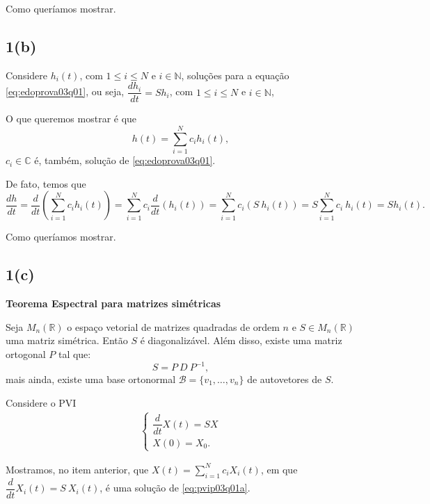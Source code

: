 Como queríamos mostrar.

\subsection*{1(b)}

Considere \(h_i(t)\), com \(1\le i\le N\) e \(i \in \mathbb{N}\), soluções para a equação \eqref{eq:edoprova03q01}, ou seja, \(\dfrac{dh_i}{dt} = S h_i\), com \(1\le i\le N\) e \(i \in \mathbb{N}\),

O que queremos mostrar é que
\[h(t) = \displaystyle\sum_{i=1}^{N} c_i h_i(t),\]
\(c_i \in \mathbb{C}\) é, também, solução de \eqref{eq:edoprova03q01}.

De fato, temos que
\[
\dfrac{dh}{dt}
=
\dfrac{d}{dt}\left(\displaystyle\sum_{i=1}^{N} c_i h_i(t)\right)
=
\displaystyle\sum_{i=1}^{N} c_i \dfrac{d}{dt} \left(h_i(t)\right)
=
\displaystyle\sum_{i=1}^{N} c_i \left(S\ h_i(t)\right)
=
S \displaystyle\sum_{i=1}^{N} c_i \ h_i(t)
=
S h_i(t).
\]

Como queríamos mostrar.


\subsection*{1(c)}

\textbf{Teorema Espectral para matrizes simétricas}

Seja \(M_n(\mathbb{R})\) o espaço vetorial de matrizes quadradas de ordem \(n\) e \(S \in M_n(\mathbb{R})\) uma matriz simétrica. Então \(S\) é diagonalizável. Além disso, existe uma matriz ortogonal \(P\) tal que:
\begin{equation}\label{eq:matrizdiagonal}
S = P\ D\ P^{-1},
\end{equation}
mais ainda, existe uma base ortonormal \(\mathcal{B} = \{v_1, \ldots, v_n\}\) de autovetores de \(S\).

Considere o PVI
\begin{eqnarray}
\left\{\begin{array}{rcl}
\label{eq:pvip03q01a}
\dfrac{d}{dt}X(t) = SX \\
\label{eq:pvip03q01a}
X(0) = X_0.
\end{array}\right.
\end{eqnarray}

Mostramos, no item anterior, que \(X(t) = \displaystyle\sum_{i=1}^{N} c_i X_i(t)\), em que \(\dfrac{d}{dt} X_i(t) = S\ X_i(t)\), é uma solução de \eqref{eq:pvip03q01a}.




